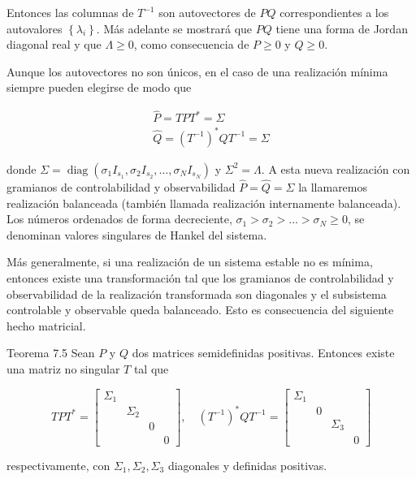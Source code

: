 Entonces las columnas de $T^{-1}$ son autovectores de $P Q$ correspondientes a los autovalores $\left\{\lambda_{i}\right\}$. Más adelante se mostrará que $P Q$ tiene una forma de Jordan diagonal real y que $\Lambda \geq 0$, como consecuencia de $P \geq 0$ y $Q \geq 0$.

Aunque los autovectores no son únicos, en el caso de una realización mínima siempre pueden elegirse de modo que

$$
\begin{gathered}
\hat{P}=T P T^{*}=\Sigma \\
\hat{Q}=\left(T^{-1}\right)^{*} Q T^{-1}=\Sigma
\end{gathered}
$$

donde $\Sigma=\operatorname{diag}\left(\sigma_{1} I_{s_{1}}, \sigma_{2} I_{s_{2}}, \ldots, \sigma_{N} I_{s_{N}}\right)$ y $\Sigma^{2}=\Lambda$. A esta nueva realización con gramianos de controlabilidad y observabilidad $\hat{P}=\hat{Q}=\Sigma$ la llamaremos realización balanceada (también llamada realización internamente balanceada). Los números ordenados de forma decreciente, $\sigma_{1}>\sigma_{2}>\ldots>\sigma_{N} \geq 0$, se denominan valores singulares de Hankel del sistema.

Más generalmente, si una realización de un sistema estable no es mínima, entonces existe una transformación tal que los gramianos de controlabilidad y observabilidad de la realización transformada son diagonales y el subsistema controlable y observable queda balanceado. Esto es consecuencia del siguiente hecho matricial.

Teorema 7.5 Sean $P$ y $Q$ dos matrices semidefinidas positivas. Entonces existe una matriz no singular $T$ tal que

$$
T P T^{*}=\left[\begin{array}{cccc}
\Sigma_{1} & & & \\
& \Sigma_{2} & & \\
& & 0 & \\
& & & 0
\end{array}\right], \quad\left(T^{-1}\right)^{*} Q T^{-1}=\left[\begin{array}{cccc}
\Sigma_{1} & & & \\
& 0 & & \\
& & \Sigma_{3} & \\
& & & 0
\end{array}\right]
$$

respectivamente, con $\Sigma_{1}, \Sigma_{2}, \Sigma_{3}$ diagonales y definidas positivas.

